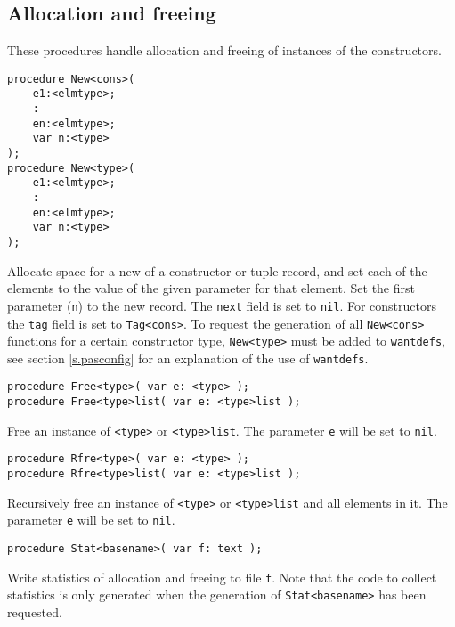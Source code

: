 \documentclass{article}
\newenvironment{desc}{\nopagebreak\vspace{-\bigskipamount}\vspace{-\parskip}\begin{list}{}{\setlength{\topsep}{0pt}\setlength{\rightmargin}{0pt}}\item[]}{\end{list}}
\begin{document}
\subsection{Allocation and freeing}
These procedures handle allocation and freeing of instances of the constructors.
\begin{verbatim}
procedure New<cons>(
    e1:<elmtype>;
    :
    en:<elmtype>;
    var n:<type>
);
procedure New<type>(
    e1:<elmtype>;
    :
    en:<elmtype>;
    var n:<type>
);
\end{verbatim}
\begin{desc}
Allocate space for a new of a constructor or tuple record,
and set each of the elements to the value of the given parameter
for that element.
Set the first parameter ({\tt n}) to the new record.
The {\tt next} field is set to {\tt nil}.
For constructors the {\tt tag} field is set to {\tt Tag<cons>}.
To request the generation of all {\tt New<cons>} functions for a certain
constructor type,
{\tt New<type>} must be added to {\tt wantdefs},
see section \ref{s.pasconfig} for an explanation of the use of {\tt wantdefs}.
\end{desc}
\begin{verbatim}
procedure Free<type>( var e: <type> );
procedure Free<type>list( var e: <type>list );
\end{verbatim}
\begin{desc}
Free an instance of {\tt <type>} or {\tt <type>list}.
The parameter {\tt e} will be set to {\tt nil}.
\end{desc}
\begin{verbatim}
procedure Rfre<type>( var e: <type> );
procedure Rfre<type>list( var e: <type>list );
\end{verbatim}
\begin{desc}
Recursively free an instance of {\tt <type>} or {\tt <type>list}
and all elements in it.
The parameter {\tt e} will be set to {\tt nil}.
\end{desc}
\begin{verbatim}
procedure Stat<basename>( var f: text );
\end{verbatim}
\begin{desc}
Write statistics of allocation and freeing to file {\tt f}.
Note that the code to collect statistics is only generated when the
generation of {\tt Stat<basename>} has been requested.
\end{desc}
\end{document}
